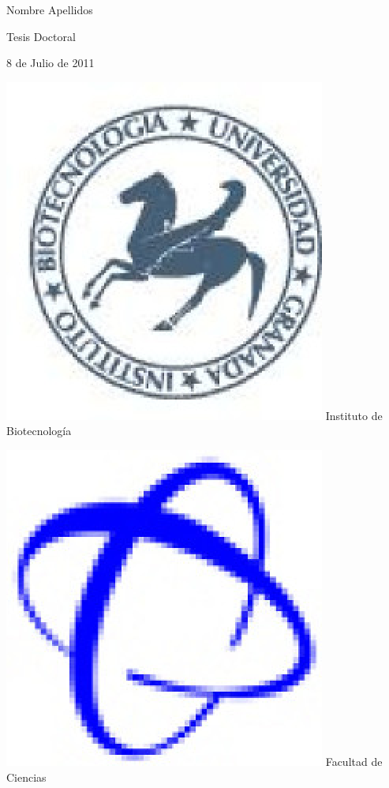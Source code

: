 \documentclass[b5paper,twoside,10pt]{book}
\begin{document}
\begin{center}
\large
Nombre Apellidos
\end{center}
\begin{center}
\large
Tesis Doctoral

8 de Julio de 2011
\end{center}
\cleardoublepage
\thispagestyle{empty}
\begin{minipage}[t]{.23\textwidth}
\centering
\includegraphics[width=.8\textwidth]{logo_ib.eps}
Instituto de Biotecnolog\'ia 
\end{minipage}
\hfill
\begin{minipage}[t]{.23\textwidth}
\centering
\includegraphics[width=.7\textwidth]{logo_ciencias.eps}
Facultad de Ciencias
\end{minipage}
\end{document}
